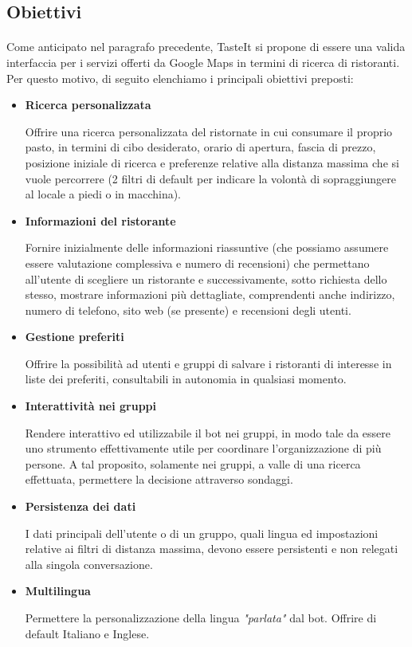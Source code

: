 \documentclass[a4paper, 12pt]{article}
\begin{document}
	\subsection{Obiettivi}
	\paragraph{}
	Come anticipato nel paragrafo precedente, TasteIt si propone di essere una valida interfaccia per i servizi offerti da Google Maps in termini di ricerca di ristoranti. Per questo motivo, di seguito elenchiamo i principali obiettivi preposti:
	\begin{itemize}
		\item \textbf{Ricerca personalizzata}
		
		Offrire una ricerca personalizzata del ristornate in cui consumare il proprio pasto, in termini di cibo desiderato, orario di apertura, fascia di prezzo, posizione iniziale di ricerca e preferenze relative alla distanza massima che si vuole percorrere (2 filtri di default per indicare la volontà di sopraggiungere al locale a piedi o in macchina).
		
		\item \textbf{Informazioni del ristorante}
		
		Fornire inizialmente delle informazioni riassuntive (che possiamo assumere essere valutazione complessiva e numero di recensioni) che permettano all'utente di scegliere un ristorante e successivamente, sotto richiesta dello stesso, mostrare informazioni più dettagliate, comprendenti anche indirizzo, numero di telefono, sito web (se presente) e recensioni degli utenti.
		
		\item \textbf{Gestione preferiti}
		
		Offrire la possibilità ad utenti e gruppi di salvare i ristoranti di interesse in liste dei preferiti, consultabili in autonomia in qualsiasi momento.
		
		\item \textbf{Interattività nei gruppi}
		
		Rendere interattivo ed utilizzabile il bot nei gruppi, in modo tale da essere uno strumento effettivamente utile per coordinare l'organizzazione di più persone. A tal proposito, solamente nei gruppi, a valle di una ricerca effettuata, permettere la decisione attraverso sondaggi.
		
		\item \textbf{Persistenza dei dati}
		
		I dati principali dell'utente o di un gruppo, quali lingua ed impostazioni relative ai filtri di distanza massima, devono essere persistenti e non relegati alla singola conversazione.
		
		\item \textbf{Multilingua}
		
		Permettere la personalizzazione della lingua \textit{"parlata"} dal bot. Offrire di default Italiano e Inglese.
	\end{itemize}
\end{document}
